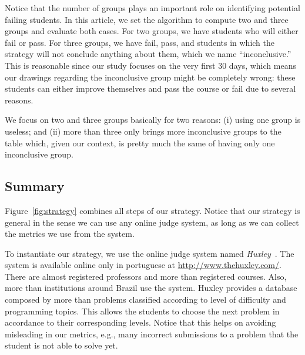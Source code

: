 Notice that the number of groups plays an important role on identifying potential failing students. In this article, we set the algorithm to compute two and three groups and evaluate both cases. For two groups, we have students who will either fail or pass. For three groups, we have fail, pass, and students in which the strategy will not conclude anything about them, which we name ``inconclusive.'' This is reasonable since our study focuses on the very first 30 days, which means our drawings regarding the inconclusive group might be completely wrong: these students can either improve themselves and pass the course or fail due to several reasons.

We focus on two and three groups basically for two reasons: (i) using one group is useless; and (ii) more than three only brings more inconclusive groups to the table which, given our context, is pretty much the same of having only one inconclusive group.

\subsection{Summary}

Figure~\ref{fig:strategy} combines all steps of our strategy. Notice that our strategy is general in the sense we can use any online judge system, as long as we can collect the metrics we use from the system.


To instantiate our strategy, we use the online judge system named \textit{Huxley}~\cite{paes2013ferramenta}. The system is available online only in portuguese at \url{http://www.thehuxley.com/}. There are almost \huxleyProfessors registered professors and more than \huxleyCourses registered courses. Also, more than \huxleyInstitutions institutions around Brazil use the system. Huxley provides a database composed by more than \huxleyProblems problems classified according to level of difficulty and programming topics. This allows the students to choose the next problem in accordance to their corresponding levels. Notice that this helps on avoiding misleading in our metrics, e.g., many incorrect submissions to a problem that the student is not able to solve yet.




